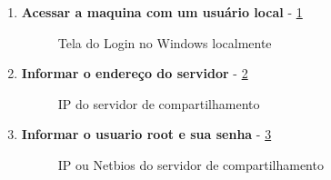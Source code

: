 \begin{enumerate}
	\item \textbf{Acessar a maquina com um usuário local} - 	\ref{login_windows_local}
	\begin{figure}[ht]
	   	\centering
	   	\caption{Tela do Login no Windows localmente}
	    \label{login_windows_local}
	\end{figure}	
	
	\item \textbf{Informar o endereço do servidor} - \ref{server_ip}
	\begin{figure}[ht]
	   	\centering
	   	\caption{IP do servidor de compartilhamento}
	    \label{server_ip}
	\end{figure}
	
	\item \textbf{Informar o usuario root e sua senha} - \ref{root_password}
	\begin{figure}[ht]
	   	\centering
	   	\caption{IP ou Netbios do servidor de compartilhamento}
	    \label{root_password}
	\end{figure}
	

\end{enumerate}
